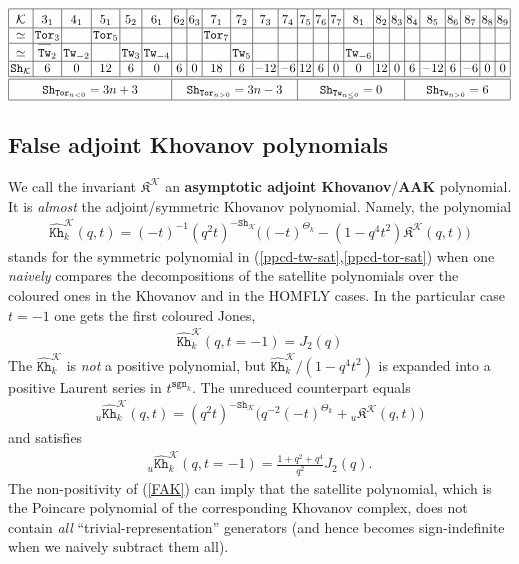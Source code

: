 \documentclass[11pt]{article}
\def\be{\begin{eqnarray}}
\def\ee{\end{eqnarray}}
\def\Km{\mathcal{K}}
\def\Kfr{\mathfrak{K}}
\def\Kh{\mathtt{Kh}}
\def\Tor{\mathtt{Tor}}
\def\Tw{\mathtt{Tw}}
\def\Sh{\mathtt{Sh}}
\def\sgn{\mathtt{sgn}}
\begin{document}
\be
\arraycolsep=0.5mm
\begin{array}{|c|c|c|c|c|c|c|c|c|c|c|c|c|c|c|c|c|c|c|c|c|c|c|c|}
	\hline\rule{0pt}{4mm}
	\Km&3_1&4_1&5_1&5_2&6_1&6_2&6_3&7_1&7_2&7_3&7_4&7_5&7_6&7_7&8_1
	&8_2&8_3&8_4&8_5&8_6&8_7&8_8&8_9\\
	\hline
	\simeq&\Tor_{3}&&\Tor_5&&&&&\Tor_7&&&&&&&&&&&&&&&\\
	\hline
	\simeq&\rule{0pt}{3mm}\overline{\rule{0pt}{3mm}\Tw}_{2}&\Tw_{-2}&&\Tw_3&\Tw_{-4}&&&&\Tw_5&&&&&&\Tw_{-6}&&&&&&&&\\
	\hline
	\Sh_{\Km}&6&0&12&6&0&6&0&18&6&-12&-6&12&6&0&0&12&0&6&-12&6&-6&0&0\\
	\hline\hline
	\multicolumn{6}{|c|}{\rule{0pt}{4mm}\Sh_{\Tor_{n<0}}=3n+3}&\multicolumn{6}{c|}{\Sh_{\Tor_{n>0}}=3n-3}&
	\multicolumn{6}{c|}{\Sh_{\Tw_{n\le0}}=0}&\multicolumn{6}{c|}{\Sh_{\Tw_{n>0}}=6}\\[0.5mm]
	\hline
\end{array}
\label{ShKn}
\ee

\subsection{False adjoint Khovanov polynomials}
We call the invariant $\Kfr^{\Km}$ an \textbf{asymptotic adjoint Khovanov}/\textbf{AAK} polynomial. It is \emph{almost} the adjoint/symmetric Khovanov polynomial. Namely, the polynomial
\be\widehat{\Kh}^{\Km}_k(q,t)=
(-t)^{-1}\left(q^2t\right)^{-\Sh_{\Km}}\Big((-t)^{\Theta_k}-\left(1-q^4t^2\right){\Kfr}^{\Km}(q,t)\Big)\label{FAK}
\ee
stands for the symmetric polynomial in (\ref{ppcd-tw-sat},\ref{ppcd-tor-sat}) when one \textit{naively} compares the decompositions of the satellite polynomials over the coloured ones in the Khovanov and in the HOMFLY cases. In the particular case $t=-1$ one gets the first coloured Jones, 
\be\widehat{\Kh}^{\Km}_k(q,t=-1)=J_2(q)\label{J-Kh-col}\ee
The $\widehat{\Kh}^{\Km}_k$  is \textit{not} a positive polynomial, but $\widehat{\Kh}^{\Km}_k/(1-q^4t^2)$ is expanded into a positive Laurent series in $t^{\sgn_k}$. The unreduced counterpart equals
\be
{_u}\widehat{\Kh}^{\Km}_k(q,t)=\left(q^2t\right)^{-\Sh_{\Km}}\Big(q^{-2}(-t)^{\Theta_k}+{{_u}\Kfr}^{\Km}(q,t)\Big)
\label{TBAKu}\ee
and satisfies
\be{_u}\widehat{\Kh}^{\Km}_k(q,t=-1)=\textstyle{\frac{1+q^2+q^4}{q^2}}J_2(q).\label{Ju-Khu-col}\ee
The non-positivity of (\ref{FAK}) can imply that the satellite polynomial, which is the Poincare polynomial of the corresponding Khovanov complex, does not contain \textit{all} ``trivial-representation'' generators (and hence becomes sign-indefinite when we naively subtract them all). 
\end{document}
